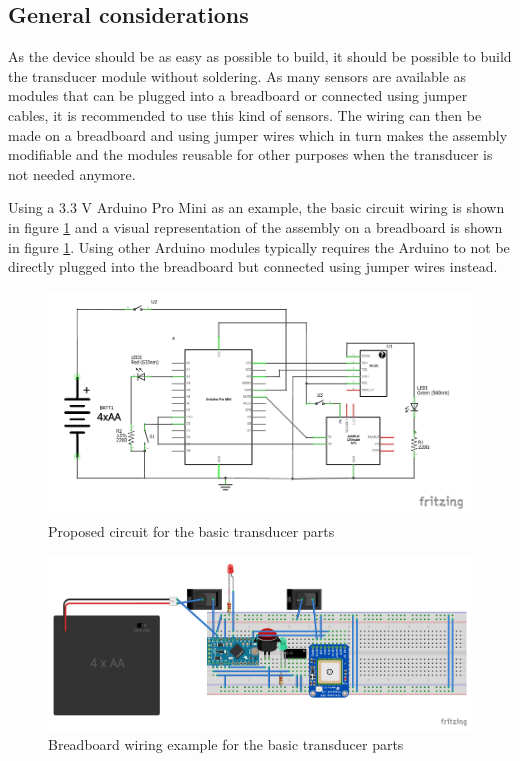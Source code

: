 \subsection{General considerations}
As the device should be as easy as possible to build, it should be possible to build the transducer module without soldering. As many sensors are available as modules that can be plugged into a breadboard or connected using jumper cables, it is recommended to use this kind of sensors. The wiring can then be made on a breadboard and using jumper wires which in turn makes the assembly modifiable and the modules reusable for other purposes when the transducer is not needed anymore.

Using a 3.3 V Arduino Pro Mini as an example, the basic circuit wiring is shown in figure \ref{fig:pro-mini-diagram} and a visual representation of the assembly on a breadboard is shown in figure \ref{fig:pro-mini-diagram}. Using other Arduino modules typically requires the Arduino to not be directly plugged into the breadboard but connected using jumper wires instead.

\begin{figure}[t]
\centering
\includegraphics[width=1.0\textwidth]{src/pro_mini_diagram.pdf}
\caption{Proposed circuit for the basic transducer parts}
\label{fig:pro-mini-diagram}
\end{figure}

\begin{figure}[t]
\centering
\includegraphics[width=1.0\textwidth]{src/pro_mini_breadboard.pdf}
\caption{Breadboard wiring example for the basic transducer parts}
\label{fig:pro-mini-breadboard}
\end{figure}

